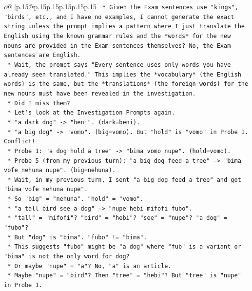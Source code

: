 \documentclass{article}
\begin{document}
{\begin{supertabular}{c@{$\;$}|p{.15\linewidth}@{}p{.15\linewidth}p{.15\linewidth}p{.15\linewidth}p{.15\linewidth}p{.15\linewidth}}
{{{\texttt{            *   Given the Exam sentences use "kings", "birds", etc., and I have no examples, I cannot generate the exact string unless the prompt implies a pattern where I just translate the English using the known grammar rules and the *words* for the new nouns are provided in the Exam sentences themselves? No, the Exam sentences are English.} \\
\texttt{            *   Wait, the prompt says "Every sentence uses only words you have already seen translated." This implies the *vocabulary* (the English words) is the same, but the *translations* (the foreign words) for the new nouns must have been revealed in the investigation.} \\
\texttt{            *   Did I miss them?} \\
\texttt{            *   Let's look at the Investigation Prompts again.} \\
\texttt{                *   "a dark dog" {-}> "beni". (dark=beni).} \\
\texttt{                *   "a big dog" {-}> "vomo". (big=vomo). But "hold" is "vomo" in Probe 1. Conflict!} \\
\texttt{                    *   Probe 1: "a dog hold a tree" {-}> "bima vomo nupe". (hold=vomo).} \\
\texttt{                    *   Probe 5 (from my previous turn): "a big dog feed a tree" {-}> "bima vofe nehuna nupe". (big=nehuna).} \\
\texttt{                    *   Wait, in my previous turn, I sent "a big dog feed a tree" and got "bima vofe nehuna nupe".} \\
\texttt{                    *   So "big" = "nehuna". "hold" = "vomo".} \\
\texttt{                *   "a tall bird see a dog" {-}> "nupe hebi mifofi fubo".} \\
\texttt{                    *   "tall" = "mifofi"? "bird" = "hebi"? "see" = "nupe"? "a dog" = "fubo"?} \\
\texttt{                    *   But "dog" is "bima". "fubo" != "bima".} \\
\texttt{                    *   This suggests "fubo" might be "a dog" where "fub" is a variant or "bima" is not the only word for dog?} \\
\texttt{                    *   Or maybe "nupe" = "a"? No, "a" is an article.} \\
\texttt{                    *   Maybe "nupe" = "bird"? Then "tree" = "hebi"? But "tree" is "nupe" in Probe 1.} \\
}}}
\end{supertabular}}
\end{document}
